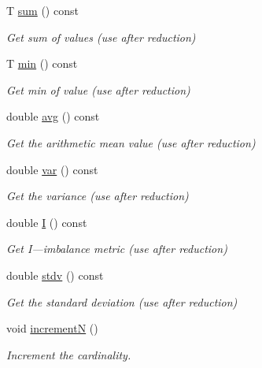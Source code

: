 \begin{DoxyCompactItemize}
T \hyperlink{structvt_1_1runtime_1_1component_1_1detail_1_1_diagnostic_value_wrapper_a6cb8450ac2aeb9020288f3287af224d7}{sum} () const
\begin{DoxyCompactList}\small\item\em Get sum of values (use after reduction) \end{DoxyCompactList}\item 
T \hyperlink{structvt_1_1runtime_1_1component_1_1detail_1_1_diagnostic_value_wrapper_acdb00b0b9110024df3e6673640702ebd}{min} () const
\begin{DoxyCompactList}\small\item\em Get min of value (use after reduction) \end{DoxyCompactList}\item 
double \hyperlink{structvt_1_1runtime_1_1component_1_1detail_1_1_diagnostic_value_wrapper_a8812305ab91c130f4a59c59fc3a3052a}{avg} () const
\begin{DoxyCompactList}\small\item\em Get the arithmetic mean value (use after reduction) \end{DoxyCompactList}\item 
double \hyperlink{structvt_1_1runtime_1_1component_1_1detail_1_1_diagnostic_value_wrapper_ab808d81bb77d4fa29de764a6ab7c1943}{var} () const
\begin{DoxyCompactList}\small\item\em Get the variance (use after reduction) \end{DoxyCompactList}\item 
double \hyperlink{structvt_1_1runtime_1_1component_1_1detail_1_1_diagnostic_value_wrapper_a922f49b7c62d63817717d285346075a3}{I} () const
\begin{DoxyCompactList}\small\item\em Get I---imbalance metric (use after reduction) \end{DoxyCompactList}\item 
double \hyperlink{structvt_1_1runtime_1_1component_1_1detail_1_1_diagnostic_value_wrapper_a543d6dc86703f061dce2b45a24a8dc9b}{stdv} () const
\begin{DoxyCompactList}\small\item\em Get the standard deviation (use after reduction) \end{DoxyCompactList}\item 
void \hyperlink{structvt_1_1runtime_1_1component_1_1detail_1_1_diagnostic_value_wrapper_af9dbf46bc45027ec5fd021a738bac3fd}{incrementN} ()
\begin{DoxyCompactList}\small\item\em Increment the cardinality. \end{DoxyCompactList}\item 

\end{DoxyCompactItemize}

